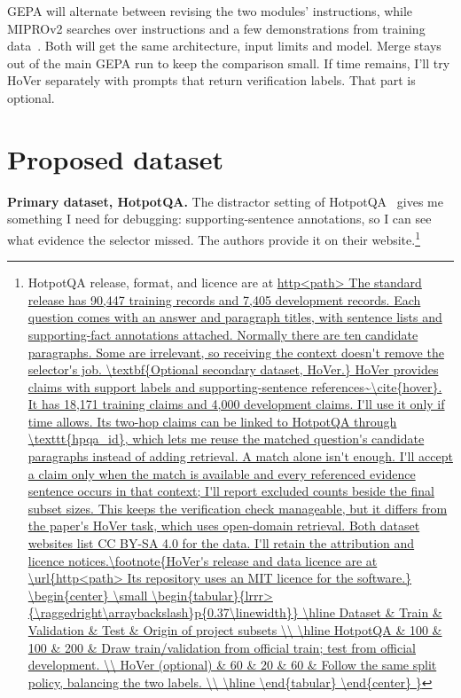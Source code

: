 \documentclass[11pt,a4paper]{article}
\begin{document}
GEPA will alternate between revising the two modules' instructions, while MIPROv2 searches over instructions and a few demonstrations from training data~\cite{mipro}. Both will get the same architecture, input limits and model. Merge stays out of the main GEPA run to keep the comparison small. If time remains, I'll try HoVer separately with prompts that return verification labels. That part is optional.

\section{Proposed dataset}
\textbf{Primary dataset, HotpotQA.} The distractor setting of HotpotQA~\cite{hotpot} gives me something I need for debugging: supporting-sentence annotations, so I can see what evidence the selector missed. The authors provide it on their website.\footnote{HotpotQA release, format, and licence are at
\url{http<path>
The standard release has 90,447 training records and 7,405 development records. Each question comes with an answer and paragraph titles, with sentence lists and supporting-fact annotations attached. Normally there are ten candidate paragraphs. Some are irrelevant, so receiving the context doesn't remove the selector's job.

\textbf{Optional secondary dataset, HoVer.} HoVer provides claims with support labels and supporting-sentence references~\cite{hover}. It has 18,171 training claims and 4,000 development claims. I'll use it only if time allows. Its two-hop claims can be linked to HotpotQA through \texttt{hpqa\_id}, which lets me reuse the matched question's candidate paragraphs instead of adding retrieval.

A match alone isn't enough. I'll accept a claim only when the match is available and every referenced evidence sentence occurs in that context; I'll report excluded counts beside the final subset sizes. This keeps the verification check manageable, but it differs from the paper's HoVer task, which uses open-domain retrieval. Both dataset websites list CC BY-SA 4.0 for the data. I'll retain the attribution and licence notices.\footnote{HoVer's release and data
licence are at \url{http<path> Its repository uses an MIT
licence for the software.}

\begin{center}
\small
\begin{tabular}{lrrr>{\raggedright\arraybackslash}p{0.37\linewidth}}
\hline
Dataset & Train & Validation & Test & Origin of project subsets \\ \hline
HotpotQA & 100 & 100 & 200 & Draw train/validation from official train;
test from official development. \\
HoVer (optional) & 60 & 20 & 60 & Follow the same split policy, balancing the two labels. \\ \hline
\end{tabular}
\end{center}

}}}
\end{document}
